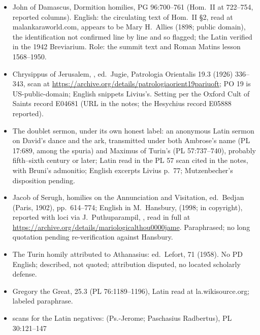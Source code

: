 \begin{itemize}
disposition pending); the  among Cyril of
Alexandria's works, PG 77:1221--1224, doubtful and so labeled; Cyril,
Ephesus Homily 4, PG 77:991--996, and Homily 11, PG 77:1029--1040 ---
verified negatives for . Greek and Latin quoted with
labeled paraphrases; short English phrases credited to Livius.
\item John of Damascus, Dormition homilies, PG 96:700--761 (Hom.~II at
722--754, reported columns). English: the circulating text of Hom.~II
\S 2, read at malankaraworld.com, appears to be Mary H.~Allies (1898;
public domain), the identification not confirmed line by line and so
flagged; the Latin verified in the 1942 Breviarium. Role: the summit
text and Roman Matins lesson 1568--1950.
\item Chrysippus of Jerusalem, , ed.\ Jugie, Patrologia Orientalis 19.3 (1926) 336--343,
scan at \url{https://archive.org/details/patrologiaorient19pariuoft};
PO 19 is US-public-domain; English snippets Livius's. Setting per the
Oxford Cult of Saints record E04681 (URL in the notes; the Hesychius
record E05888 reported).
\item The doublet sermon, under its own honest label: an anonymous
Latin sermon on David's dance and the ark, transmitted under both
Ambrose's name (PL 17:689, among the spuria) and Maximus of Turin's
(PL 57:737--740), probably fifth--sixth century or later; Latin read in
the PL 57 scan cited in the notes, with Bruni's admonitio; English
excerpts Livius p.~77; Mutzenbecher's disposition pending.
\item Jacob of Serugh, homilies on the Annunciation and Visitation,
ed.\ Bedjan (Paris, 1902), pp.~614--774; English in M.~Hansbury,
 (1998; in copyright), reported with loci
via J.~Puthuparampil, , read in full at
\url{https://archive.org/details/mariologicalthou0000jame}.
Paraphrased; no long quotation pending re-verification against
Hansbury.
\item The Turin homily attributed to Athanasius: ed.\ Lefort,  71 (1958). No PD English; described, not quoted; attribution
disputed, no located scholarly defense.
\item Gregory the Great,  25.3 (PL
76:1189--1196), Latin read at la.wikisource.org; labeled paraphrase.
\item {} scans for the Latin negatives:
 (Ps.-Jerome; Paschasius Radbertus), PL 30:121--147

\end{itemize}
